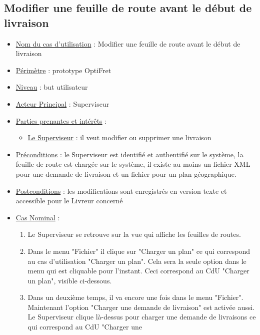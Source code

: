 \documentclass[a4paper]{report}
\begin{document}
\subsection{Modifier une feuille de route avant le début de livraison}
\begin{itemize}[label = \textbullet, font = \color{orange}]
    \item \underline{Nom du cas d'utilisation} : Modifier une feuille de route
        avant le début de livraison
    \item \underline{Périmètre} : prototype OptiFret
    \item \underline{Niveau} : but utilisateur
    \item \underline{Acteur Principal} : Superviseur
    \item \underline{Parties prenantes et intérêts} :
    \begin{itemize}[label = \textbullet, font = \color{blue}]
        \item \underline{Le Superviseur} : il veut modifier ou supprimer une
            livraison
    \end{itemize}
    \item \underline{Préconditions} : le Superviseur est identifié et
        authentifié sur le système, la feuille de route est chargée sur le
        système, il existe au moins un fichier XML pour une demande de
        livraison et un fichier pour un plan géographique.
    \item \underline{Postconditions} : les modifications sont enregistrés en
        version texte et accessible pour le Livreur concerné
    \item \underline{Cas Nominal} :
    \begin{enumerate}
        \item Le Superviseur se retrouve sur la vue qui affiche les feuilles de
            routes.
        \item Dans le menu "Fichier" il clique sur "Charger un plan" ce qui
            correspond au cas d'utilisation "Charger un plan". Cela sera la
            seule option dans le menu qui est cliquable pour l'instant. Ceci
            correspond au CdU "Charger un plan", visible ci-dessous.
        \item Dans un deuxième temps, il va encore une fois dans le menu
            "Fichier". Maintenant l'option "Charger une demande de livraison"
            est activée aussi. Le Superviseur clique là-dessus pour charger une
            demande de livraisons ce qui correspond au CdU "Charger une

\end{enumerate}
\end{itemize}
\end{document}
